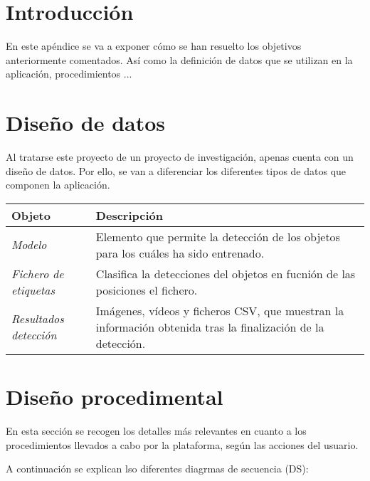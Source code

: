 
\section{Introducción}
En este apéndice se va a exponer cómo se han resuelto los objetivos anteriormente comentados. Así como la definición de datos que se utilizan en la aplicación, procedimientos ...

\section{Diseño de datos}
Al tratarse este proyecto de un proyecto de investigación, apenas cuenta con un diseño de datos. Por ello, se van a diferenciar los diferentes tipos de datos que componen la aplicación.
\begin{table}[H]
    \centering
    \begin{tabular}{l p{5cm}}
        \toprule
        \textbf{Objeto} & \textbf{Descripción}\\
        \midrule
        \textit{Modelo} & Elemento que permite la detección de los objetos para los cuáles ha sido entrenado. \\
        \textit{Fichero de etiquetas} & Clasifica la detecciones del objetos en fucnión de las posiciones el fichero. \\
        \textit{Resultados detección} & Imágenes, vídeos y ficheros CSV, que muestran la información obtenida tras la finalización de la detección. \\
        \bottomrule
    \end{tabular}
\end{table}

\section{Diseño procedimental}

En esta sección se recogen los detalles más relevantes en cuanto a los procedimientos llevados a cabo por la plataforma, según las acciones del usuario.

A continuación se explican lso diferentes diagrmas de secuencia (DS):

